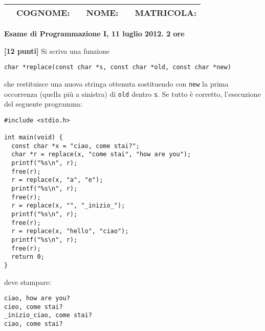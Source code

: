 \documentclass{article}[10pt]
\newcounter{esnu}
\newenvironment{esercizio}{\medskip \noindent {\bf Esercizio\addtocounter{esnu}{1} \arabic{esnu}}}{}
\begin{document}
\begin{tabular}{llclcr}
 \hspace{-35pt} &{\bf COGNOME:} & \hspace{100pt}        &{\bf NOME:}    & \hspace{100pt}        &{\bf MATRICOLA:}\hspace{35pt} \\
\hline
\end{tabular}
\begin{center} {\bf Esame di Programmazione I, 11 luglio 2012. 2 ore}\end{center}

\begin{esercizio}
\textbf{[12 punti]}
Si scriva una funzione

\begin{verbatim}
char *replace(const char *s, const char *old, const char *new)
\end{verbatim}

\noindent
che restituisce una nuova stringa ottenuta sostituendo
con \texttt{new} la prima occorrenza (quella pi\`u a sinistra) di \texttt{old} dentro \texttt{s}.
Se tutto \`e corretto, l'esecuzione del seguente programma:

{\small
\begin{verbatim}
#include <stdio.h>

int main(void) {
  const char *x = "ciao, come stai?";
  char *r = replace(x, "come stai", "how are you");
  printf("%s\n", r);
  free(r);
  r = replace(x, "a", "e");
  printf("%s\n", r);
  free(r);
  r = replace(x, "", "_inizio_");
  printf("%s\n", r);
  free(r);
  r = replace(x, "hello", "ciao");
  printf("%s\n", r);
  free(r);
  return 0;
}
\end{verbatim}
}

\noindent
deve stampare:

{\small
\begin{verbatim}
ciao, how are you?
cieo, come stai?
_inizio_ciao, come stai?
ciao, come stai?
\end{verbatim}
}

\end{esercizio}
\end{document}
